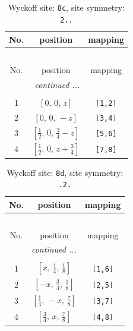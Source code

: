 \documentclass[fleqn,8pt]{jsarticle}
\begin{document}
\renewcommand{\arraystretch}{1.2}
\begin{longtable}{ccc}
\caption{Wyckoff site: {\tt 8c}, site symmetry: {\tt 2..}}
 \\
 \hline \hline
No. & position & mapping \\ \hline \endfirsthead

\multicolumn{2}{l}{\tablename\ \thetable{}} \\
 \hline \hline
No. & position & mapping \\ \hline \endhead

 \hline \hline
\multicolumn{2}{r}{\footnotesize\it continued ...} \\ \endfoot

 \hline \hline
\multicolumn{2}{r}{} \\ \endlastfoot

1 & $\left[ 0,\, 0,\, z \right]$ & {\tt [1,2]} \\ \hline
2 & $\left[ 0,\, 0,\, - z \right]$ & {\tt [3,4]} \\ \hline
3 & $\left[ \frac{1}{2},\, 0,\, \frac{3}{4} - z \right]$ & {\tt [5,6]} \\ \hline
4 & $\left[ \frac{1}{2},\, 0,\, z + \frac{3}{4} \right]$ & {\tt [7,8]} \\
\end{longtable}
\renewcommand{\arraystretch}{1.2}
\begin{longtable}{ccc}
\caption{Wyckoff site: {\tt 8d}, site symmetry: {\tt .2.}}
 \\
 \hline \hline
No. & position & mapping \\ \hline \endfirsthead

\multicolumn{2}{l}{\tablename\ \thetable{}} \\
 \hline \hline
No. & position & mapping \\ \hline \endhead

 \hline \hline
\multicolumn{2}{r}{\footnotesize\it continued ...} \\ \endfoot

 \hline \hline
\multicolumn{2}{r}{} \\ \endlastfoot

1 & $\left[ x,\, \frac{1}{4},\, \frac{1}{8} \right]$ & {\tt [1,6]} \\ \hline
2 & $\left[ - x,\, \frac{3}{4},\, \frac{1}{8} \right]$ & {\tt [2,5]} \\ \hline
3 & $\left[ \frac{1}{4},\, - x,\, \frac{7}{8} \right]$ & {\tt [3,7]} \\ \hline
4 & $\left[ \frac{3}{4},\, x,\, \frac{7}{8} \right]$ & {\tt [4,8]} \\
\end{longtable}
\end{document}
